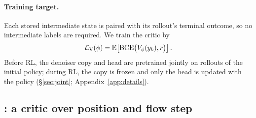 \paragraph{Training target.}
Each stored intermediate state is paired with its rollout's terminal outcome, so no intermediate labels are required. We train the critic by
\begin{equation}
\mathcal L_{\rm V}(\phi)
=
\mathbb E\!\left[
\mathrm{BCE}\bigl(V_\phi(y_k),r\bigr)
\right].
\label{eq:bce}
\end{equation}
Before RL, the denoiser copy and head are pretrained jointly on rollouts of the initial policy; during RL, the copy is frozen and only the head is updated with the policy (\S\ref{sec:joint}; Appendix~\ref{app:details}).

\subsection{\methodSVGTwoD{}: a critic over position and flow step}
\label{sec:jpc_2d}
